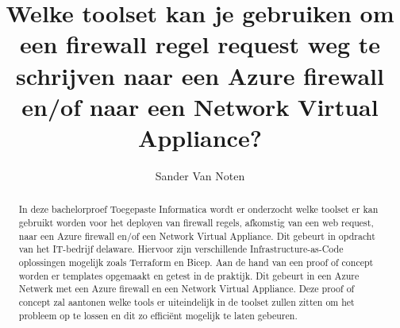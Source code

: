 \documentclass{hogent-article}
\title{Welke toolset kan je gebruiken om een firewall regel request weg te schrijven naar een Azure firewall en/of naar een Network Virtual Appliance?}
\author{Sander Van Noten}
\begin{document}
\begin{abstract}
  In deze bachelorproef Toegepaste Informatica wordt er onderzocht welke toolset er kan gebruikt worden voor het deployen van firewall regels, afkomstig van een web request, naar een Azure firewall en/of een Network Virtual Appliance. Dit gebeurt in opdracht van het IT-bedrijf delaware. Hiervoor zijn verschillende Infrastructure-as-Code oplossingen mogelijk zoals Terraform en Bicep. Aan de hand van een proof of concept worden er templates opgemaakt en getest in de praktijk. Dit gebeurt in een Azure Netwerk met een Azure firewall en een Network Virtual Appliance. Deze proof of concept zal aantonen welke tools er uiteindelijk in de toolset zullen zitten om het probleem op te lossen en dit zo efficiënt mogelijk te laten gebeuren. 
\end{abstract}

\tableofcontents



\printbibliography[heading=bibintoc]
\end{document}
